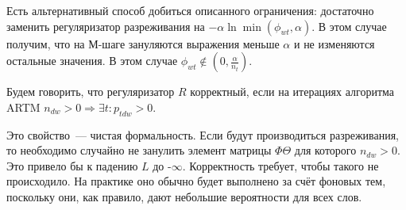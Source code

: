 \documentclass[12pt, twoside]{article}
\begin{document}
Есть альтернативный способ добиться описанного ограничения: достаточно заменить регуляризатор разреживания на $-\alpha \ln \min(\phi_{wt}, \alpha)$. В этом случае получим, что на М-шаге зануляются выражения меньше $\alpha$ и не изменяются остальные значения. В этом случае $\phi_{wt}\notin (0, \frac{\alpha}{n_t})$.

\begin{Definition}
\label{fairreg}
Будем говорить, что регуляризатор $R$ корректный, если на итерациях алгоритма ARTM $n_{dw} > 0 \Rightarrow \exists t\colon p_{tdw} > 0$.
\end{Definition}

Это свойство~--- чистая формальность. Если будут производиться разреживания, то необходимо случайно не занулить элемент матрицы $\Phi \Theta$ для которого $n_{dw} > 0$. Это привело бы к падению $L$ до -$\infty$.  Корректность требует, чтобы такого не происходило. На практике оно обычно будет выполнено за счёт фоновых тем\cite{vorontsov2014tutorial}, поскольку они, как правило, дают небольшие вероятности для всех слов.
\end{document}
